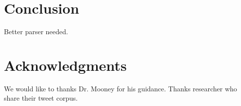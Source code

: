 \section{Conclusion}
\label{sec:length}
Better parser needed. 

\section*{Acknowledgments}
We would like to thanks Dr. Mooney for his guidance. Thanks researcher who share their tweet corpus. 
